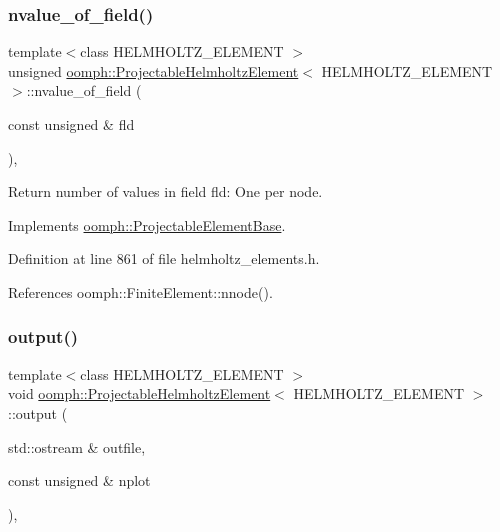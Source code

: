 \subsubsection{\texorpdfstring{nvalue\+\_\+of\+\_\+field()}{nvalue\_of\_field()}}
{\footnotesize\ttfamily template$<$class H\+E\+L\+M\+H\+O\+L\+T\+Z\+\_\+\+E\+L\+E\+M\+E\+NT $>$ \\
unsigned \hyperlink{classoomph_1_1ProjectableHelmholtzElement}{oomph\+::\+Projectable\+Helmholtz\+Element}$<$ H\+E\+L\+M\+H\+O\+L\+T\+Z\+\_\+\+E\+L\+E\+M\+E\+NT $>$\+::nvalue\+\_\+of\+\_\+field (\begin{DoxyParamCaption}\item[{const unsigned \&}]{fld }\end{DoxyParamCaption})\hspace{0.3cm}{\ttfamily [inline]}, {\ttfamily [virtual]}}



Return number of values in field fld\+: One per node. 



Implements \hyperlink{classoomph_1_1ProjectableElementBase_a1a9a6de16f3511bca8e8be770abb9c2e}{oomph\+::\+Projectable\+Element\+Base}.



Definition at line 861 of file helmholtz\+\_\+elements.\+h.



References oomph\+::\+Finite\+Element\+::nnode().

\mbox{\label{classoomph_1_1ProjectableHelmholtzElement_ab7b86d1f7ae0c54e512ebf0816dab665}} 
\subsubsection{\texorpdfstring{output()}{output()}}
{\footnotesize\ttfamily template$<$class H\+E\+L\+M\+H\+O\+L\+T\+Z\+\_\+\+E\+L\+E\+M\+E\+NT $>$ \\
void \hyperlink{classoomph_1_1ProjectableHelmholtzElement}{oomph\+::\+Projectable\+Helmholtz\+Element}$<$ H\+E\+L\+M\+H\+O\+L\+T\+Z\+\_\+\+E\+L\+E\+M\+E\+NT $>$\+::output (\begin{DoxyParamCaption}\item[{std\+::ostream \&}]{outfile,  }\item[{const unsigned \&}]{nplot }\end{DoxyParamCaption})\hspace{0.3cm}{\ttfamily [inline]}, {\ttfamily [virtual]}}



